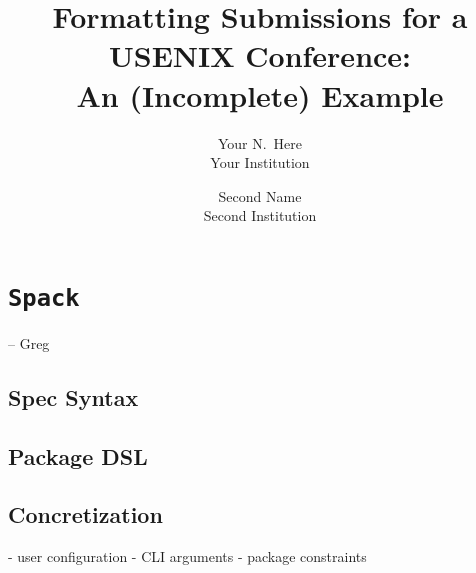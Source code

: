 \usepackage{inconsolata}
\usepackage[outputdir=build]{minted}


\newcommand{\tg}[1]{\ifisdraft{\color{blue}[#1 -- Todd]}\fi}
\newcommand{\spack}{\texttt{Spack}}
\newcommand{\clingo}{\texttt{clingo}}


\date{}

\title{\Large \bf Formatting Submissions for a USENIX Conference:\\
  An (Incomplete) Example}

\author{
{\rm Your N.\ Here}\\
Your Institution
\and
{\rm Second Name}\\
Second Institution
} %

\maketitle





\section{\spack}
\label{sec:software-model}
-- Greg
\subsection{Spec Syntax}

\subsection{Package DSL}

\subsection{Concretization}
- user configuration
- CLI arguments
- package constraints

